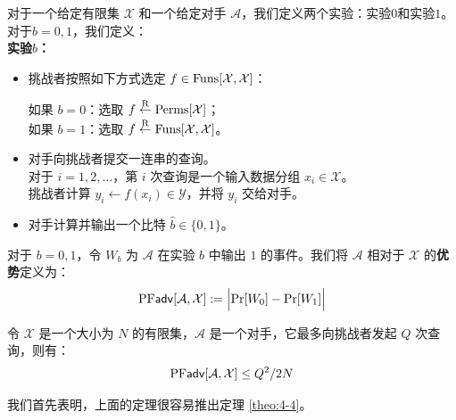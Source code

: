\begin{game}[置换 \emph{vs.} 函数]\label{game:4-3}
对于一个给定有限集 $\mathcal{X}$ 和一个给定对手 $\mathcal{A}$，我们定义两个实验：实验$0$和实验$1$。对于$b=0,1$，我们定义：\\
\textbf{实验$b$：}
\begin{itemize}
	\item 挑战者按照如下方式选定 $f\in{\rm Funs}[\mathcal{X},\mathcal{X}]$：
	\vspace{1pt}
	
	\hspace*{5pt} 如果 $b=0$：选取 $f\overset{\rm R}\leftarrow{\rm Perms}[\mathcal{X}]$；\\
	\hspace*{5pt} 如果 $b=1$：选取 $f\overset{\rm R}\leftarrow{\rm Funs}[\mathcal{X},\mathcal{X}]$。
	\item 对手向挑战者提交一连串的查询。\\
	对于 $i=1,2,\dots$，第 $i$ 次查询是一个输入数据分组 $x_i\in\mathcal{X}$。\\
	挑战者计算 $y_i\leftarrow f(x_i)\in\mathcal{Y}$，并将 $y_i$ 交给对手。
	\item 对手计算并输出一个比特 $\hat{b}\in\{0,1\}$。
\end{itemize}
对于 $b=0,1$，令 $W_b$ 为 $\mathcal{A}$ 在实验 $b$ 中输出 $1$ 的事件。我们将 $\mathcal{A}$ 相对于 $\mathcal{X}$ 的\textbf{优势}定义为：
\[
{\rm PF\mathsf{adv}}[\mathcal{A}, \mathcal{X}]:=
\Big\lvert
{\rm Pr}[W_0]-{\rm Pr}[W_1]
\Big\rvert
\]
\end{game}

\begin{theorem}\label{theo:4-6}
令 $\mathcal{X}$ 是一个大小为 $N$ 的有限集，$\mathcal{A}$ 是一个对手，它最多向挑战者发起 $Q$ 次查询，则有：
\[
{\rm PF\mathsf{adv}}[\mathcal{A},\mathcal{X}]\leq{Q^2}/{2N}
\]
\end{theorem}


我们首先表明，上面的定理很容易推出定理 \ref{theo:4-4}。

